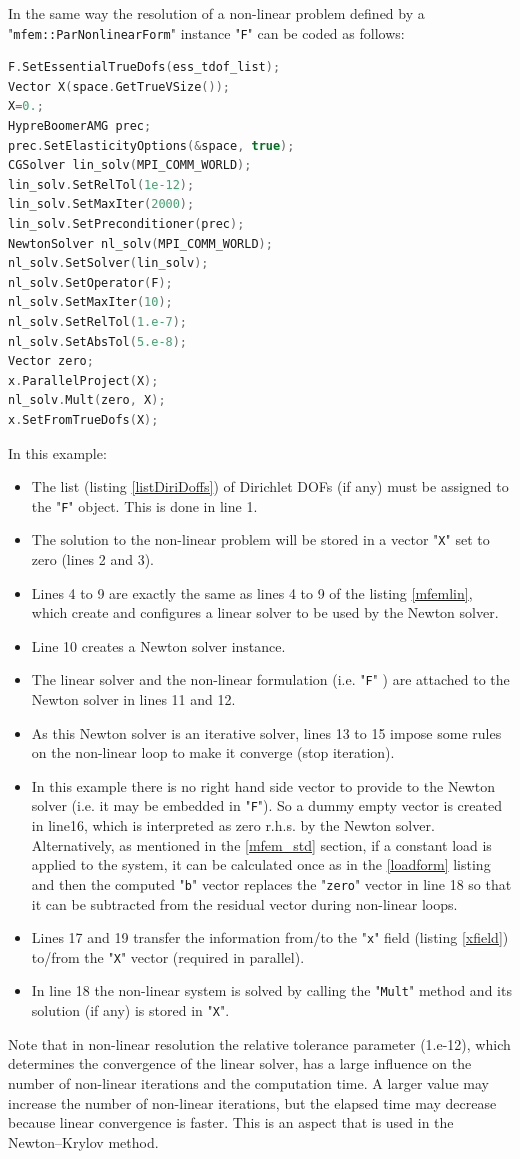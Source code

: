 \documentclass[12pt]{article}
\newcommand{\mycode}[1]{\textsf{"}\lstinline`#1`\textsf{"}}
\begin{document}
In the same way the resolution of a non-linear problem defined by a \mycode{mfem::ParNonlinearForm} instance \mycode{F} can be coded as follows:
\begin{lstlisting}[basicstyle=\footnotesize,language=c++,label=mfemnlstd]
F.SetEssentialTrueDofs(ess_tdof_list);
Vector X(space.GetTrueVSize());
X=0.;
HypreBoomerAMG prec;
prec.SetElasticityOptions(&space, true);
CGSolver lin_solv(MPI_COMM_WORLD);
lin_solv.SetRelTol(1e-12);
lin_solv.SetMaxIter(2000);
lin_solv.SetPreconditioner(prec);
NewtonSolver nl_solv(MPI_COMM_WORLD);
nl_solv.SetSolver(lin_solv);
nl_solv.SetOperator(F);
nl_solv.SetMaxIter(10);
nl_solv.SetRelTol(1.e-7);
nl_solv.SetAbsTol(5.e-8);
Vector zero;
x.ParallelProject(X);
nl_solv.Mult(zero, X);
x.SetFromTrueDofs(X);
\end{lstlisting}
In this example:
\begin{itemize}
	\item The list (listing \ref{listDiriDoffs}) of Dirichlet DOFs (if any) must be assigned to the \mycode{F} object. This is done in line 1.
	\item The solution to the non-linear problem will be stored in a vector \mycode{X} set to zero (lines 2 and 3).
	\item Lines 4 to 9 are exactly the same as lines 4 to 9 of the listing \ref{mfemlin}, which create and configures a linear solver to be used by the Newton solver.
	\item Line 10 creates a Newton solver instance.
	\item The linear solver and the non-linear formulation (i.e. \mycode{F} ) are attached to the Newton solver in lines 11 and 12.
	\item As this Newton solver is an iterative solver, lines 13 to 15 impose some rules on the non-linear loop to make it converge (stop iteration).
	\item In this example there is no right hand side vector to provide to the Newton solver (i.e. it may be embedded in \mycode{F}). So a dummy empty vector is created in line16, which is interpreted as zero r.h.s. by the Newton solver. Alternatively, as mentioned in the \ref{mfem_std} section, if a constant load is applied to the system, it can be calculated once as in the \ref{loadform} listing and then the computed \mycode{b} vector replaces the \mycode{zero} vector in line 18 so that it can be subtracted from the residual vector during non-linear loops.	
	\item Lines 17 and 19 transfer the information from/to the \mycode{x} field (listing \ref{xfield}) to/from the \mycode{X} vector (required in parallel).
	\item In line 18 the non-linear system is solved by calling the \mycode{Mult} method and its solution (if any) is stored in \mycode{X}. 
\end{itemize}
Note that in non-linear resolution the relative tolerance parameter (1.e-12), which determines the convergence of the linear solver, has a large influence on the number of non-linear iterations and the computation time.
A larger value may increase the number of non-linear iterations, but the elapsed time may decrease because linear convergence is faster.
This is an aspect that is used in the Newton–Krylov method.
\end{document}
